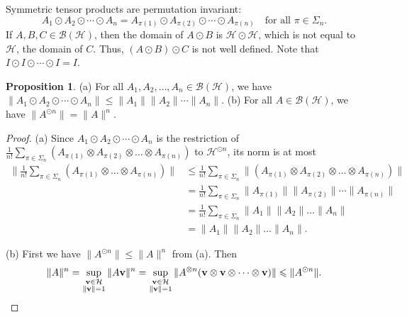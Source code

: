 \documentclass[10pt,reqno]{amsart}
\newcommand{\0}{{\color{lightgray}0}}
\newcommand{\B}{\mathcal{B}}
\renewcommand{\leq}{\leqslant}
\newcommand{\h}{\mathcal{H}}
\renewcommand{\vec}[1]{{\bf #1}}
\theoremstyle{definition}
\newtheorem{Proposition}[equation]{Proposition}
\numberwithin{equation}{section}
\begin{document}
Symmetric tensor products are permutation invariant:
\begin{equation}\label{eq:PermInvariance}
A_1 \odot A_2 \odot \cdots \odot  A_n
= A_{\pi(1)} \odot A_{\pi(2)} \odot \cdots \odot  A_{\pi(n)}
\quad \text{for all $\pi \in \Sigma_n$}.
\end{equation}
If $A, B , C \in \B(\h)$, then the domain of $A \odot B$ is $\h \odot \h$, which is not equal to $\h$, the domain of $C$. 
Thus, $( A \odot B ) \odot C$ is not well defined.
Note that $I \odot I \odot \cdots \odot I = I$.


\begin{Proposition}\label{Proposition:BasicNormInequality}
(a) For all $A_1,  A_2,  \ldots , A_n \in \B (\h)$, we have
$\| A_1 \odot A_2 \odot \cdots \odot A_n \| \leq \|A_1\| \|A_2 \| \cdots \| A_n \|$.
(b) For all $A \in \B(\h)$, we have $\| A^{\odot n} \| = \| A \|^n$.
\end{Proposition}

\begin{proof}
(a) Since $ A_1 \odot A_2 \odot \cdots \odot A_n $ is the restriction of 
$ \frac{1}{n!}\sum_{\pi\in \Sigma_n}(A_{\pi(1)}  \otimes A_{\pi(2)} \otimes \dots \otimes A_{\pi(n)}) $ to $\h^{\odot n}$,
its norm is at most
\begin{align}
     \Big\| \frac{1}{n!}\sum_{\pi\in \Sigma_n}(A_{\pi(1)}   \otimes \dots \otimes A_{\pi(n)}) \Big\| 
    &\leq \frac{1}{n!}\sum_{\pi\in \Sigma_n}\|(A_{\pi(1)}  \otimes A_{\pi(2)} \otimes \dots \otimes A_{\pi(n)}) \| \\
    &= \frac{1}{n!}\sum_{\pi\in \Sigma_n}\|A_{\pi(1)}  \| \| A_{\pi(2)} \|  \cdots \| A_{\pi(n)} \| \\ 
    &= \frac{1}{n!}\sum_{\pi\in \Sigma_n}\|A_{1}  \| \| A_{2} \|  \dots \| A_{n} \| \\
    &= \|A_1\| \|A_2 \| \ldots \| A_n \|.
\end{align}

\noindent(b)  First we have $\| A^{\odot n} \| \leq \| A \|^n$ from (a).  Then
\begin{equation*}
    \|A \|^n 
    = \sup_{ \substack{ \vec{v} \in \h \\ \| \vec{v}\| = 1}} \|A\vec{v} \|^n 
    = \sup_{ \substack{ \vec{v} \in \h \\ \| \vec{v}\| = 1}} \| A^{\otimes n} (\vec{v} \otimes \vec{v} \otimes \cdots \otimes \vec{v}) \| 
    \leq \| A^{\odot n} \|. \qedhere
\end{equation*}
\end{proof}
\end{document}
